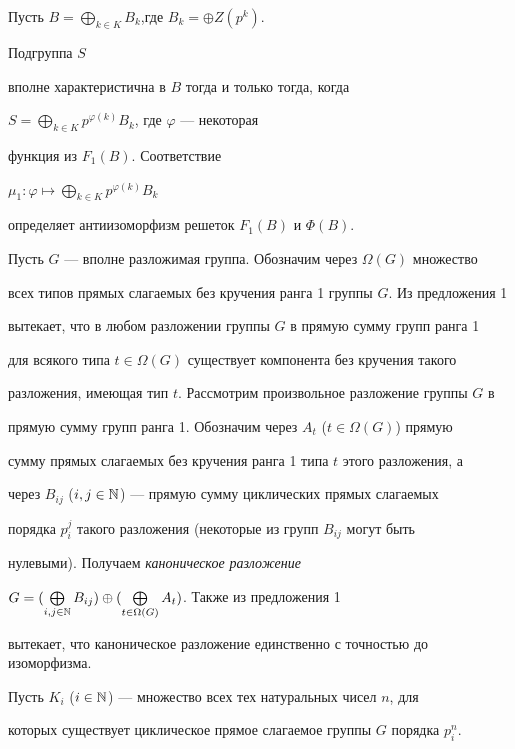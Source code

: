 \begin{prop}


Пусть $B=\bigoplus\limits_{k\in K}B_k$,где $B_k=\oplus Z(p^k)$.


Подгруппа $S$ 


вполне характеристична в $B$ тогда и только тогда, когда


$S=\bigoplus\limits_{k\in K}p^{\varphi(k)}B_k$, где $\varphi$ --- некоторая


функция из $F_1(B)$. Соответствие


$\mu_1: \varphi\longmapsto\bigoplus\limits_{k\in K}p^{\varphi(k)}B_k$


определяет антиизоморфизм решеток $F_1(B)$ и $\Phi(B)$.


\end{prop}





Пусть $G$ --- вполне разложимая группа. Обозначим через $\Omega(G)$ множество


всех типов прямых слагаемых без кручения ранга 1 группы $G$. Из предложения 1


вытекает, что в любом разложении группы $G$ в прямую сумму групп ранга 1


для всякого типа $t\in\Omega(G)$ существует компонента без кручения такого


разложения, имеющая тип $t$. Рассмотрим произвольное разложение группы $G$ в


прямую сумму групп ранга 1.  Обозначим через $A_t$ ($t\in\Omega(G)$) прямую


сумму прямых слагаемых без кручения ранга 1 типа $t$ этого разложения, а


через $B_{ij}$ ($i,j\in\Bbb N$) --- прямую сумму циклических прямых слагаемых


порядка $p^j_i$ такого разложения (некоторые из групп $B_{ij}$ могут быть


нулевыми). Получаем {\em каноническое разложение}


$G=(\bigoplus\limits_{i,j\in\Bbb N}


B_{ij})\oplus(\bigoplus\limits_{t\in\Omega(G)}A_t)$. Также из предложения 1


вытекает, что каноническое разложение единственно с точностью до изоморфизма.


Пусть $K_i$ ($i\in\Bbb N$) --- множество всех тех натуральных чисел $n$, для


которых существует циклическое прямое слагаемое группы $G$ порядка $p^n_i$.





